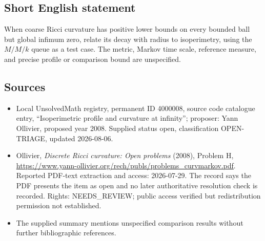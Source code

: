 \documentclass[11pt]{article}
\begin{document}
\subsection{Short English statement}
When coarse Ricci curvature has positive lower bounds on every bounded ball but global infimum zero, relate its decay with radius to isoperimetry, using the $M/M/k$ queue as a test case. The metric, Markov time scale, reference measure, and precise profile or comparison bound are unspecified.
\subsection{Sources}
\begin{itemize}
\item Local UnsolvedMath registry, permanent ID 4000008, source code catalogue entry, ``Isoperimetric profile and curvature at infinity''; proposer: Yann Ollivier, proposed year 2008. Supplied status open, classification OPEN-TRIAGE, updated 2026-08-06.
\item Ollivier, \emph{Discrete Ricci curvature: Open problems} (2008), Problem H, \url{https://www.yann-ollivier.org/rech/publs/problems_curvmarkov.pdf}. Reported PDF-text extraction and access: 2026-07-29. The record says the PDF presents the item as open and no later authoritative resolution check is recorded. Rights: NEEDS\_REVIEW; public access verified but redistribution permission not established.
\item The supplied summary mentions unspecified comparison results without further bibliographic references.
\end{itemize}
\end{document}
